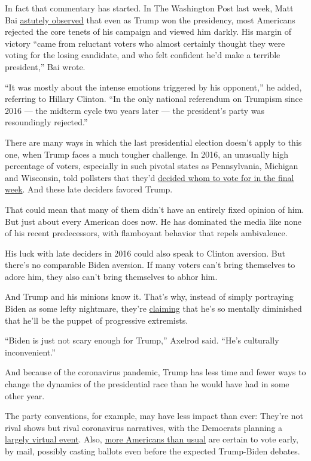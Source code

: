 In fact that commentary has started. In The Washington Post last week,
Matt Bai
\href{https://www.washingtonpost.com/opinions/2020/06/22/2016-what-democrats-get-wrong-about-that-election/}{astutely
observed} that even as Trump won the presidency, most Americans rejected
the core tenets of his campaign and viewed him darkly. His margin of
victory ``came from reluctant voters who almost certainly thought they
were voting for the losing candidate, and who felt confident he'd make a
terrible president,'' Bai wrote.

``It was mostly about the intense emotions triggered by his opponent,''
he added, referring to Hillary Clinton. ``In the only national
referendum on Trumpism since 2016 --- the midterm cycle two years later
--- the president's party was resoundingly rejected.''

There are many ways in which the last presidential election doesn't
apply to this one, when Trump faces a much tougher challenge. In 2016,
an unusually high percentage of voters, especially in such pivotal
states as Pennsylvania, Michigan and Wisconsin, told pollsters that
they'd
\href{https://www.washingtonpost.com/news/the-fix/wp/2016/11/17/how-america-decided-at-the-very-last-moment-to-elect-donald-trump/}{decided
whom to vote for in the final week}. And these late deciders favored
Trump.

That could mean that many of them didn't have an entirely fixed opinion
of him. But just about every American does now. He has dominated the
media like none of his recent predecessors, with flamboyant behavior
that repels ambivalence.

His luck with late deciders in 2016 could also speak to Clinton
aversion. But there's no comparable Biden aversion. If many voters can't
bring themselves to adore him, they also can't bring themselves to abhor
him.

And Trump and his minions know it. That's why, instead of simply
portraying Biden as some lefty nightmare, they're
\href{https://www.nytimes.com/2020/05/17/opinion/trump-biden-age.html}{claiming}
that he's so mentally diminished that he'll be the puppet of progressive
extremists.

``Biden is just not scary enough for Trump,'' Axelrod said. ``He's
culturally inconvenient.''

And because of the coronavirus pandemic, Trump has less time and fewer
ways to change the dynamics of the presidential race than he would have
had in some other year.

The party conventions, for example, may have less impact than ever:
They're not rival shows but rival coronavirus narratives, with the
Democrats planning a
\href{https://www.wispolitics.com/2020/2020-dem-national-convention-moving-to-largely-virtual-format-smaller-venue/}{largely
virtual event}. Also,
\href{https://www.theatlantic.com/politics/archive/2020/04/voting-mail-2020-race-between-biden-and-trump/609799/}{more
Americans than usual} are certain to vote early, by mail, possibly
casting ballots even before the expected Trump-Biden debates.


